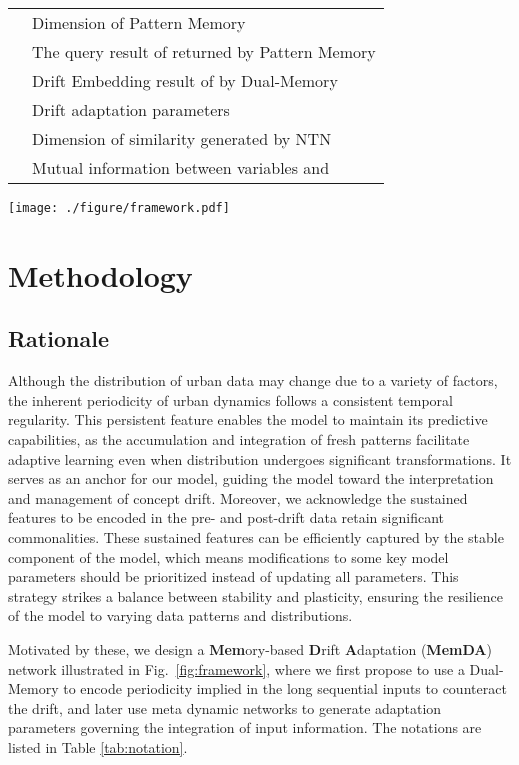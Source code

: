 \documentclass[sigconf]{acmart}
\begin{document}
\begin{table}[h]
{\begin{tabular*}{9.8cm}{@{\extracolsep{\fill}}ll}
                      & Dimension of Pattern Memory \\
              & The query result of  returned by Pattern Memory \\
                       & Drift Embedding result of  by Dual-Memory\\
                       & Drift adaptation parameters\\
                       & Dimension of similarity generated by NTN\\
                    & Mutual information between variables  and  \\
		\hline
	\end{tabular*}}
\end{table} 

\begin{figure*}[h]
	\centering
	\texttt{[image: ./figure/framework.pdf]}
	\caption{The framework of the memory-based drift adaptation model.}
	\label{fig:framework}
\end{figure*}

\section{Methodology}
\subsection{Rationale}
Although the distribution of urban data may change due to a variety of factors, the inherent periodicity of urban dynamics follows a consistent temporal regularity\cite{gonzalez2008understanding}. This persistent feature enables the model to maintain its predictive capabilities, as the accumulation and integration of fresh patterns facilitate adaptive learning even when distribution undergoes significant transformations. It serves as an anchor for our model, guiding the model toward the interpretation and management of concept drift. Moreover, we acknowledge the sustained features to be encoded in the pre- and post-drift data retain significant commonalities. These sustained features can be efficiently captured by the stable component of the model, which means modifications to some key model parameters should be prioritized instead of updating all parameters. This strategy strikes a balance between stability and plasticity, ensuring the resilience of the model to varying data patterns and distributions.

Motivated by these, we design a \textbf{Mem}ory-based \textbf{D}rift \textbf{A}daptation (\textbf{MemDA}) network illustrated in Fig.~\ref{fig:framework}, where we first propose to use a Dual-Memory to encode periodicity implied in the long sequential inputs to counteract the drift, and later use meta dynamic networks to generate adaptation parameters governing the integration of input information. The notations are listed in Table \ref{tab:notation}.
\end{document}
